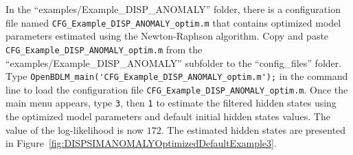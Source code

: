 In the ``examples/Example\_DISP\_ANOMALY'' folder, there is a configuration file named \lstinline[basicstyle = \mlttfamily \small, backgroundcolor = \color{light-gray}]!CFG_Example_DISP_ANOMALY_optim.m! that contains optimized model parameters estimated using the Newton-Raphson algorithm.
Copy and paste \lstinline[basicstyle = \mlttfamily \small, backgroundcolor = \color{light-gray}]!CFG_Example_DISP_ANOMALY_optim.m! from  the ``examples/Example\_DISP\_ANOMALY'' subfolder  to the ``config\_files'' folder.
Type \colorbox{light-gray}{\lstinline[basicstyle = \mlttfamily \small, backgroundcolor = \color{light-gray}]!OpenBDLM_main('CFG_Example_DISP_ANOMALY_optim.m');!} in the \MATLAB{} command line to load the configuration file  \lstinline[basicstyle = \mlttfamily \small, backgroundcolor = \color{light-gray}]!CFG_Example_DISP_ANOMALY_optim.m!.
Once the main menu appears, type  \colorbox{light-gray}{\lstinline[basicstyle = \mlttfamily \small, backgroundcolor = \color{light-gray}]!3!}, then \colorbox{light-gray}{\lstinline[basicstyle = \mlttfamily \small, backgroundcolor = \color{light-gray}]!1!} to estimate the filtered hidden states using the optimized model parameters and default initial hidden states values.
The value of the log-likelihood is now $172$.
The estimated hidden states are presented in Figure~\ref{fig:DISPSIMANOMALYOptimizedDefaultExample3}.

